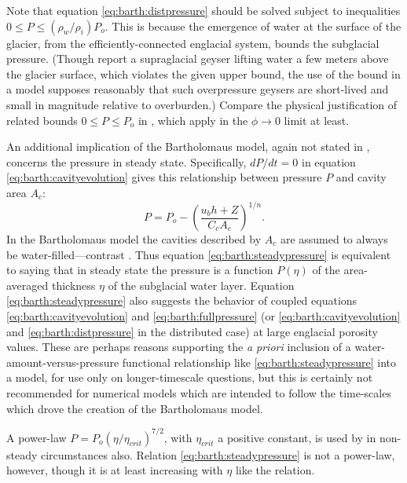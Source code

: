 \documentclass[twocolumn]{igs}
\begin{document}
Note that equation \eqref{eq:barth:distpressure} should be solved subject to inequalities $0 \le P \le (\rho_w/\rho_i) P_o$.  This is because the emergence of water at the surface of the glacier, from the efficiently-connected englacial system, bounds the subglacial pressure.  (Though \cite{Bartholomausetal2011} report a supraglacial geyser lifting water a few meters above the glacier surface, which violates the given upper bound, the use of the bound in a model supposes reasonably that such overpressure geysers are short-lived and small in magnitude relative to overburden.)  Compare the physical justification of related bounds $0 \le P \le P_o$ in \cite{Schoofetal2012}, which apply in the $\phi\to 0$ limit at least.

An additional implication of the Bartholomaus model, again not stated in \cite{Bartholomausetal2011}, concerns the pressure in steady state.  Specifically, $dP/dt=0$ in equation \eqref{eq:barth:cavityevolution} gives this relationship between pressure $P$ and cavity area $A_c$:
\begin{equation}
P = P_o - \left(\frac{u_b h + Z}{C_c A_c}\right)^{1/n}. \label{eq:barth:steadypressure}
\end{equation}
In the Bartholomaus model the cavities described by $A_c$ are assumed to always be water-filled---contrast \citep{Schoofetal2012}.  Thus equation \eqref{eq:barth:steadypressure} is equivalent to saying that in steady state the pressure is a function $P(\eta)$ of the area-averaged thickness $\eta$ of the subglacial water layer. Equation \eqref{eq:barth:steadypressure} also suggests the behavior of coupled equations \eqref{eq:barth:cavityevolution} and \eqref{eq:barth:fullpressure} (or \eqref{eq:barth:cavityevolution} and \eqref{eq:barth:distpressure} in the distributed case) at large englacial porosity values.  These are perhaps reasons supporting the \emph{a priori} inclusion of a water-amount-versus-pressure functional relationship like \eqref{eq:barth:steadypressure} into a model, for use only on longer-timescale questions, but this is certainly not recommended for numerical models which are intended to follow the time-scales which drove the creation of the Bartholomaus model.

A power-law $P = P_o (\eta/\eta_{crit})^{7/2}$, with $\eta_{crit}$ a positive constant, is used by \cite{FlowersClarke2002_theory} in non-steady circumstances also.  Relation \eqref{eq:barth:steadypressure} is not a power-law, however, though it is at least increasing with $\eta$ like the \cite{FlowersClarke2002_theory} relation.
\end{document}

